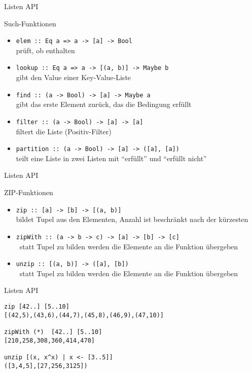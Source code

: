 \documentclass[fleqn,11pt,aspectratio=43]{beamer}
\begin{document}
\begin{frame}[fragile]{Listen API}
\begin{block}{Such-Funktionen}
\begin{itemize}
\item \lstinline|elem :: Eq a => a -> [a] -> Bool | \\ prüft, ob enthalten
\item \lstinline|lookup :: Eq a => a -> [(a, b)] -> Maybe b| \\ gibt den Value einer Key-Value-Liste
\item \lstinline|find :: (a -> Bool) -> [a] -> Maybe a| \\ gibt das erste Element zurück, das die Bedingung erfüllt
\item \lstinline|filter :: (a -> Bool) -> [a] -> [a]| \\ filtert die Liste (Positiv-Filter)
\item \lstinline|partition :: (a -> Bool) -> [a] -> ([a], [a])| \\ teilt eine Liste in zwei Listen mit "`erfüllt"' und "`erfüllt nicht"'
\end{itemize}
\end{block}
\end{frame}

\begin{frame}[fragile]{Listen API}
\begin{block}{ZIP-Funktionen}
\begin{itemize}
\item \lstinline|zip :: [a] -> [b] -> [(a, b)]| \\ bildet Tupel aus den Elementen, Anzahl ist beschränkt nach der kürzesten
\item \lstinline|zipWith :: (a -> b -> c) -> [a] -> [b] -> [c]| \\ statt Tupel zu bilden werden die Elemente an die Funktion übergeben
\item \lstinline|unzip :: [(a, b)] -> ([a], [b])| \\ statt Tupel zu bilden werden die Elemente an die Funktion übergeben
\end{itemize}
\end{block}
\end{frame}

\begin{frame}[fragile]{Listen API}
\begin{lstlisting}
zip [42..] [5..10]
[(42,5),(43,6),(44,7),(45,8),(46,9),(47,10)]

zipWith (*)  [42..] [5..10]
[210,258,308,360,414,470]

unzip [(x, x^x) | x <- [3..5]]
([3,4,5],[27,256,3125])
\end{lstlisting}
\end{frame}


\end{document}
